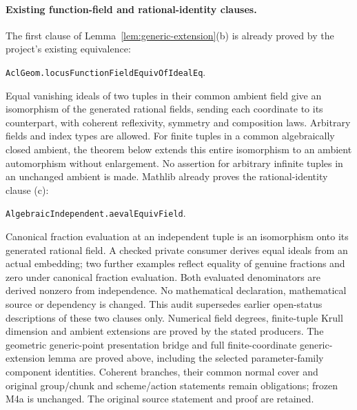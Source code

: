 \documentclass[11pt,oneside]{article}
\theoremstyle{definition}
\theoremstyle{remark}
\begin{document}
\paragraph{Existing function-field and rational-identity clauses.}
The first clause of Lemma~\ref{lem:generic-extension}(b) is already proved
by the project's existing equivalence:
\par\noindent
\texttt{AclGeom.locusFunctionFieldEquivOfIdealEq}.
\par\noindent
Equal vanishing ideals of two tuples in their common ambient field give
an isomorphism of the generated rational fields, sending each coordinate
to its counterpart, with coherent reflexivity, symmetry and composition
laws. Arbitrary fields and index types are allowed. For finite tuples in a common algebraically closed ambient, the theorem
below extends this entire isomorphism to an ambient automorphism without
enlargement. No assertion for arbitrary infinite tuples in an unchanged
ambient is made.
Mathlib already proves the rational-identity clause (c):
\par\noindent
\texttt{AlgebraicIndependent.aevalEquivField}.
\par\noindent
Canonical fraction evaluation at an independent tuple is an isomorphism
onto its generated rational field. A checked private consumer derives
equal ideals from an actual embedding; two further examples reflect
equality of genuine fractions and zero under canonical fraction evaluation.
Both evaluated denominators are derived nonzero from independence.
No mathematical declaration, mathematical source or dependency is changed.
This audit supersedes earlier open-status descriptions of these two
clauses only.
Numerical field degrees, finite-tuple Krull dimension and ambient
extensions are proved by the stated producers. The geometric generic-point
presentation bridge and full finite-coordinate generic-extension lemma
are proved above, including the selected parameter-family component identities.
Coherent branches, their common normal cover and original group/chunk and
scheme/action statements remain obligations; frozen M4a is unchanged. The original source
statement and proof are retained.

\clearpage
\end{document}
